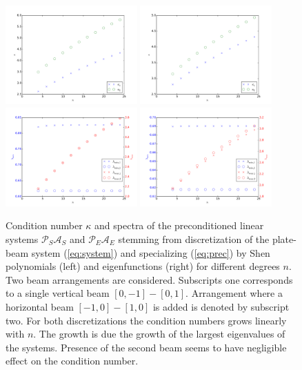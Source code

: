 \documentclass{marine_2015}
\begin{document}
 \begin{figure}[t!]
 \centering
 \includegraphics[width=0.45\textwidth]{img/Precond_shen_cond}
 \includegraphics[width=0.45\textwidth]{img/Precond_sine_cond}\\
 \includegraphics[width=0.45\textwidth]{img/prec_shen_spectrum}
 \includegraphics[width=0.45\textwidth]{img/prec_sine_spectrum}\\
 \caption{
 Condition number $\kappa$ and spectra of the preconditioned linear systems 
 $\mathcal{P}_S\mathcal{A}_S$ and $\mathcal{P}_E\mathcal{A}_E$
 stemming from discretization of the plate-beam system (\ref{eq:system}) and
 specializing (\ref{eq:prec}) by Shen polynomials (left) and eigenfunctions (right) 
 for different degrees $n$.
 Two beam arrangements are considered. Subscripts one corresponds to a single vertical beam
 $\left[0, -1\right]-\left[0, 1\right]$. Arrangement where a horizontal beam 
 $\left[-1, 0\right]-\left[1, 0\right]$ is added is denoted by subscript two.
 For both discretizations the condition numbers grows linearly with $n$. The growth 
 is due the growth of the largest eigenvalues of the systems. Presence of the
 second beam seems to have negligible effect on the condition number.
 }
 \label{fig:precond}
 \end{figure}
\end{document}
